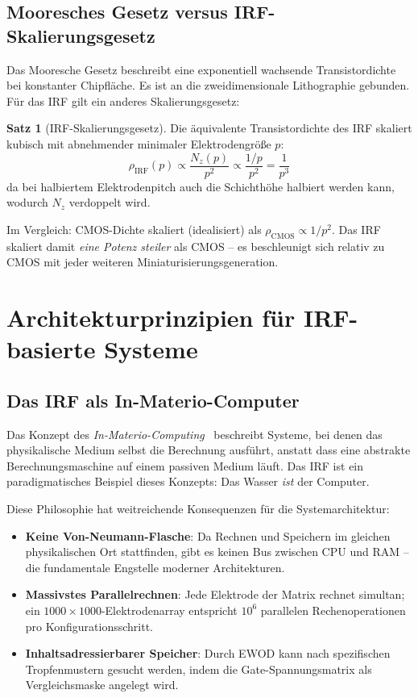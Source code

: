 ﻿\documentclass[a4paper,12pt]{scrreprt}
\theoremstyle{definition}
\newtheorem{satz}{Satz}[section]
\begin{document}
\subsection{Mooresches Gesetz versus IRF-Skalierungsgesetz}

Das Mooresche Gesetz beschreibt eine exponentiell wachsende Transistordichte
bei konstanter Chipfläche. Es ist an die zweidimensionale Lithographie
gebunden. Für das IRF gilt ein anderes Skalierungsgesetz:

\begin{satz}[IRF-Skalierungsgesetz]
	Die äquivalente Transistordichte des IRF skaliert kubisch mit abnehmender
	minimaler Elektrodengröße $p$:
	\begin{equation}
		\rho_{\mathrm{IRF}}(p) \propto \frac{N_z(p)}{p^2} \propto \frac{1/p}{p^2} = \frac{1}{p^3}
		\label{eq:irf_skalierung}
	\end{equation}
	da bei halbiertem Elektrodenpitch auch die Schichthöhe halbiert werden kann,
	wodurch $N_z$ verdoppelt wird.
\end{satz}

Im Vergleich: CMOS-Dichte skaliert (idealisiert) als $\rho_{\mathrm{CMOS}} \propto 1/p^2$.
Das IRF skaliert damit \emph{eine Potenz steiler} als CMOS -- es beschleunigt
sich relativ zu CMOS mit jeder weiteren Miniaturisierungsgeneration.

\section{Architekturprinzipien für IRF-basierte Systeme}

\subsection{Das IRF als In-Materio-Computer}

Das Konzept des \emph{In-Materio-Computing}~\cite{miller2002} beschreibt Systeme,
bei denen das physikalische Medium selbst die Berechnung ausführt, anstatt
dass eine abstrakte Berechnungsmaschine auf einem passiven Medium läuft.
Das IRF ist ein paradigmatisches Beispiel dieses Konzepts: Das Wasser
\emph{ist} der Computer.

Diese Philosophie hat weitreichende Konsequenzen für die Systemarchitektur:
\begin{itemize}
	\item \textbf{Keine Von-Neumann-Flasche}: Da Rechnen und Speichern
	im gleichen physikalischen Ort stattfinden, gibt es keinen Bus
	zwischen CPU und RAM -- die fundamentale Engstelle moderner Architekturen.
	\item \textbf{Massivstes Parallelrechnen}: Jede Elektrode der Matrix
	rechnet simultan; ein $1000 \times 1000$-Elektrodenarray entspricht
	$10^6$ parallelen Rechenoperationen pro Konfigurationsschritt.
	\item \textbf{Inhaltsadressierbarer Speicher}: Durch EWOD kann nach
	spezifischen Tropfenmustern gesucht werden, indem die Gate-Spannungsmatrix
	als Vergleichsmaske angelegt wird.
\end{itemize}
\end{document}

